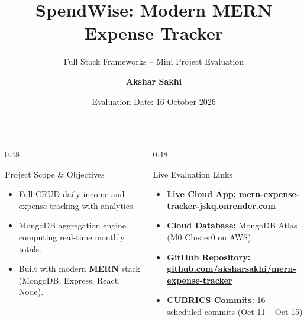 \documentclass[aspectratio=169, 10pt]{beamer}
\title[\textbf{SpendWise -- MERN Expense Tracker}]{\textbf{SpendWise: Modern MERN Expense Tracker}}
\subtitle{Full Stack Frameworks -- Mini Project Evaluation}
\author[\textbf{Akshar Sakhi}]{\textbf{Akshar Sakhi}}
\institute[Amrita Vishwa Vidyapeetham]{Department of Computer Science and Engineering\\Amrita Vishwa Vidyapeetham}
\date[16 October 2026]{Evaluation Date: 16 October 2026}
\begin{document}
\begin{frame}
  \titlepage
  \begin{columns}[T]
    \begin{column}{0.48\textwidth}
      \begin{block}{\centering Project Scope \& Objectives}
        \footnotesize
        \begin{itemize}
          \item Full CRUD daily income and expense tracking with analytics.
          \item MongoDB aggregation engine computing real-time monthly totals.
          \item Built with modern \textbf{MERN} stack (MongoDB, Express, React, Node).
        \end{itemize}
      \end{block}
    \end{column}

    \begin{column}{0.48\textwidth}
      \begin{exampleblock}{\centering Live Evaluation Links}
        \footnotesize
        \begin{itemize}
          \item \textbf{Live Cloud App:} \href{https://mern-expense-tracker-jskq.onrender.com}{\textcolor{AccentEmerald}{\textbf{mern-expense-tracker-jskq.onrender.com}}}
          \item \textbf{Cloud Database:} MongoDB Atlas (M0 Cluster0 on AWS)
          \item \textbf{GitHub Repository:} \href{https://github.com/aksharsakhi/mern-expense-tracker}{\textcolor{PrimaryIndigo}{\textbf{github.com/aksharsakhi/mern-expense-tracker}}}
          \item \textbf{CUBRICS Commits:} 16 scheduled commits (Oct 11 -- Oct 15)
        \end{itemize}
      \end{exampleblock}
    \end{column}
  \end{columns}
\end{frame}
\end{document}
